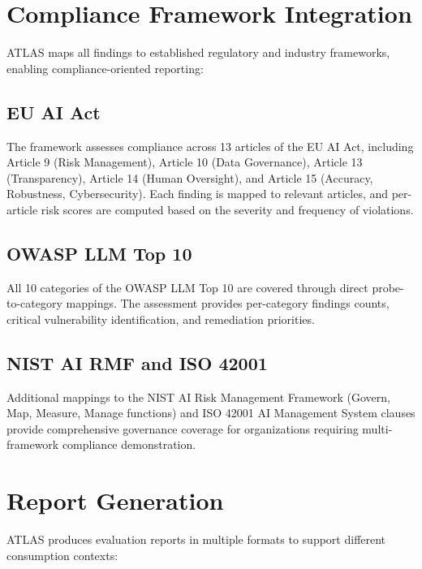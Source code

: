 \documentclass[12pt,a4paper]{report}
\begin{document}
\section{Compliance Framework Integration}
\label{sec:compliance-integration}

ATLAS maps all findings to established regulatory and industry frameworks, enabling compliance-oriented reporting:

\subsection{EU AI Act}

The framework assesses compliance across 13 articles of the EU AI Act, including Article 9 (Risk Management), Article 10 (Data Governance), Article 13 (Transparency), Article 14 (Human Oversight), and Article 15 (Accuracy, Robustness, Cybersecurity). Each finding is mapped to relevant articles, and per-article risk scores are computed based on the severity and frequency of violations.

\subsection{OWASP LLM Top 10}

All 10 categories of the OWASP LLM Top 10 are covered through direct probe-to-category mappings. The assessment provides per-category findings counts, critical vulnerability identification, and remediation priorities.

\subsection{NIST AI RMF and ISO 42001}

Additional mappings to the NIST AI Risk Management Framework (Govern, Map, Measure, Manage functions) and ISO 42001 AI Management System clauses provide comprehensive governance coverage for organizations requiring multi-framework compliance demonstration.

\section{Report Generation}
\label{sec:report-generation}

ATLAS produces evaluation reports in multiple formats to support different consumption contexts:
\end{document}
